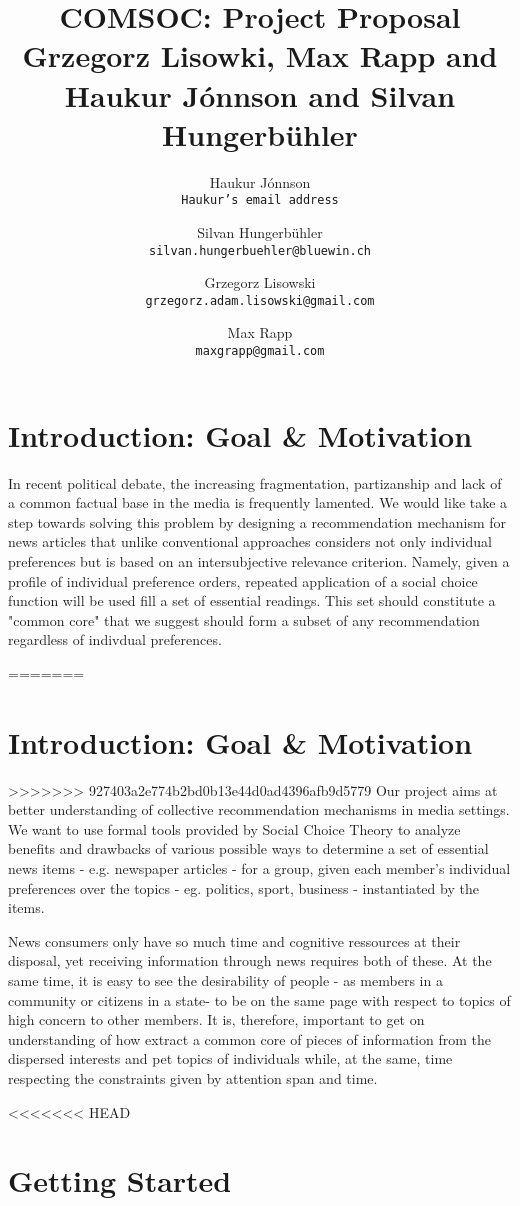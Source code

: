 \documentclass[10pt,a4paper, english]{article}
\author{
    Haukur J{\'o}nnson\\    \texttt{Haukur's email address}
    \and
    Silvan Hungerb{\"u}hler\\   \texttt{silvan.hungerbuehler@bluewin.ch}
    \and
    Grzegorz Lisowski\\  \texttt{grzegorz.adam.lisowski@gmail.com}
    \and
    Max Rapp\\  \texttt{maxgrapp@gmail.com}
}
\title{%
  COMSOC: Project Proposal \\
  \small Grzegorz Lisowki, Max Rapp and Haukur J{\'o}nnson and Silvan Hungerb{\"u}hler }
\date{}
\begin{document}
\maketitle

\section{Introduction: Goal \& Motivation}

In recent political debate, the increasing fragmentation, partizanship and lack of a common factual base in the media is frequently lamented. We would like take a step towards solving this problem by designing a recommendation mechanism for news articles that unlike conventional approaches considers not only individual preferences but is based on an intersubjective relevance criterion. Namely, given a profile of individual preference orders, repeated application of a social choice function will be used fill a set of essential readings. This set should constitute a "common core" that we suggest should form a subset of any recommendation regardless of indivdual preferences.

=======
\section{Introduction: Goal \& Motivation}
>>>>>>> 927403a2e774b2bd0b13e44d0ad4396afb9d5779
Our project aims at better understanding of collective recommendation mechanisms in media settings. We want to use formal tools provided by Social Choice Theory to analyze benefits and drawbacks of various possible ways to determine a set of essential news items - e.g. newspaper articles - for a group, given each member's individual preferences over the topics - eg. politics, sport, business - instantiated by the items.

News consumers only have so much time and cognitive ressources at their disposal, yet receiving information through news requires both of these. At the same time, it is easy to see the desirability of people - as members in a community or citizens in a state- to be on the same page with respect to topics of high concern to other members. It is, therefore, important to get on understanding of how extract a common core of pieces of information from the dispersed interests and pet topics of individuals while, at the same, time respecting the constraints given by attention span and time.

<<<<<<< HEAD
\section{Getting Started}
\end{document}
